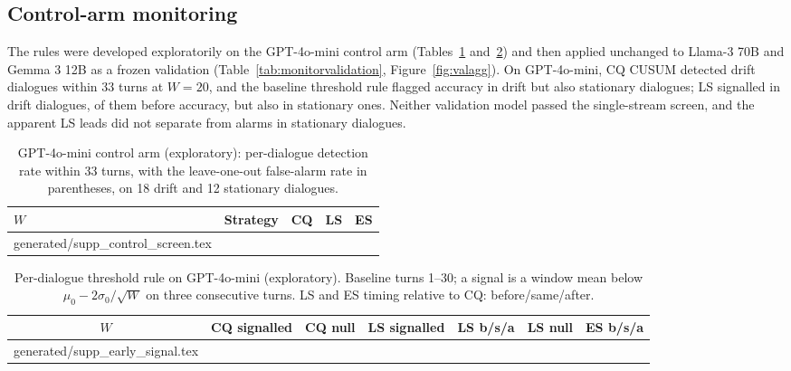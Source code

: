 \documentclass[10pt]{article}
\makeatletter
\newcommand{\inputtable}[1]{\@@input #1 }
\makeatother
\begin{document}
\subsection{Control-arm monitoring}
\label{sec:control-monitoring}
The rules were developed exploratorily on the GPT-4o-mini control arm
(Tables~\ref{tab:ctrlscreen} and~\ref{tab:early}) and then applied unchanged to
Llama-3 70B and Gemma 3 12B as a frozen validation (Table~\ref{tab:monitorvalidation},
Figure~\ref{fig:valagg}). On GPT-4o-mini, CQ CUSUM detected \ctrlScreenDetect{}
drift dialogues within 33 turns at $W=20$, and the baseline threshold rule
flagged accuracy in \earlyCqSignal{} drift but also \earlyCqNull{} stationary
dialogues; LS signalled in \earlyLsSignal{} drift dialogues, \earlyLsBefore{} of
them before accuracy, but also in \earlyLsNull{} stationary ones. Neither
validation model passed the single-stream screen, and the apparent LS leads did
not separate from alarms in stationary dialogues.

\begin{table}[h]\centering\small
\caption{GPT-4o-mini control arm (exploratory): per-dialogue detection rate
within 33 turns, with the leave-one-out false-alarm rate in parentheses, on 18
drift and 12 stationary dialogues.}
\label{tab:ctrlscreen}
\begin{tabular}{llccc}\toprule
$W$ & Strategy & CQ & LS & ES\\\midrule
\inputtable{generated/supp_control_screen.tex}
\bottomrule\end{tabular}\end{table}

\begin{table}[h]\centering\small
\caption{Per-dialogue threshold rule on GPT-4o-mini (exploratory). Baseline
turns 1--30; a signal is a window mean below $\mu_0-2\sigma_0/\sqrt{W}$ on three
consecutive turns. LS and ES timing relative to CQ: before/same/after.}
\label{tab:early}
\begin{tabular}{ccccccc}\toprule
$W$ & CQ signalled & CQ null & LS signalled & LS b/s/a & LS null & ES b/s/a\\\midrule
\inputtable{generated/supp_early_signal.tex}
\bottomrule\end{tabular}\end{table}
\end{document}
